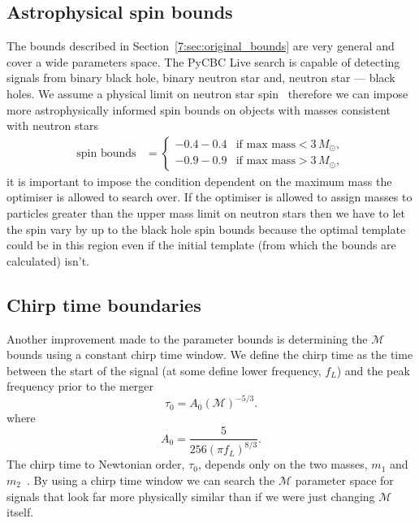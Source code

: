 \subsection{Astrophysical spin bounds}

The bounds described in Section~\ref{7:sec:original_bounds} are very general and cover a wide parameters space. The PyCBC Live search is capable of detecting \gwadj signals from binary black hole, binary neutron star and, neutron star — black holes. We assume a physical limit on  neutron star spin~\cite{Harry_Lundgren:2012} therefore we can impose more astrophysically informed spin bounds on objects with masses consistent with neutron stars
%
\begin{align}
    \text{spin bounds} &= 
    \begin{cases} 
        -0.4 - 0.4 & \text{if } \text{max mass} < 3 \, M_{\odot}, \\
        -0.9 - 0.9 & \text{if } \text{max mass} > 3 \, M_{\odot},
    \end{cases} 
\end{align}
%
it is important to impose the condition dependent on the maximum mass the optimiser is allowed to search over. If the optimiser is allowed to assign masses to particles greater than the upper mass limit on neutron stars then we have to let the spin vary by up to the black hole spin bounds because the optimal template could be in this region even if the initial template (from which the bounds are calculated) isn't.

\subsection{Chirp time boundaries}

Another improvement made to the parameter bounds is determining the $\mathcal{M}$ bounds using a constant chirp time window. We define the chirp time as the time between the start of the signal (at some define lower frequency, $f_{L}$) and the peak frequency prior to the merger
%
\begin{equation}
    \tau_0 = A_{0}\left(\mathcal{M}\right)^{-5/3}.
\end{equation}
%
where
%
\begin{equation}
    A_{0} = \frac{5}{256 \left(\pi f_{L}\right)^{8/3}}.
\end{equation}
%
The chirp time to Newtonian order, $\tau_{0}$, depends only on the two masses, $m_{1}$ and $m_{2}$~\cite{Cokelaer:2007}. By using a chirp time window we can search the $\mathcal{M}$ parameter space for signals that look far more physically similar than if we were just changing $\mathcal{M}$ itself.

